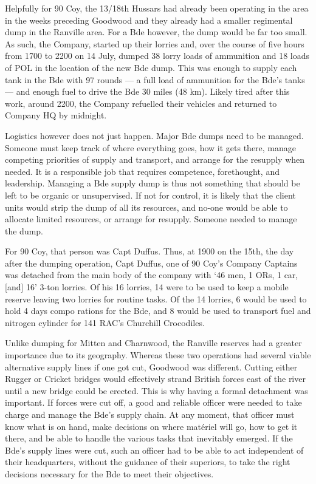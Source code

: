 \documentclass[noraggedright]{turabian-researchpaper}
\begin{document}
Helpfully for 90 Coy, the 13/18th Hussars had already been operating in the 
area in the weeks preceding Goodwood and they already had a smaller 
regimental dump in the Ranville area.  For a Bde however, the dump would be 
far too small.  As such, the Company, started up their lorries and, over the 
course of five hours from 1700 to 2200 on 14 July, dumped 38 lorry loads of 
ammunition and 18 loads of POL in the location of the new Bde dump.  This was 
enough to supply each tank in the Bde with 97 rounds --- a full load of 
ammunition for the Bde's tanks --- and enough fuel to drive the Bde 30 miles 
(48 km).  Likely tired after this work, around 2200, the Company refuelled 
their vehicles and returned to Company HQ by midnight.\autocite[14 July 1944]
{90wd}

Logistics however does not just happen.  Major Bde dumps need to be managed.  
Someone must keep track of where everything goes, how it gets there, manage 
competing priorities of supply and transport, and arrange for the resupply
when needed.  It is a responsible job that requires competence, forethought, 
and leadership.  Managing a Bde supply dump is thus not something that should 
be left to be organic or unsupervised.  If not for control, it is likely that 
the client units would strip the dump of all its resources, and no-one would 
be able to allocate limited resources, or arrange for resupply.  Someone 
needed to manage the dump.  

For 90 Coy, that person was Capt Duffus.  Thus, at 1900 on the 15th, the day 
after the dumping operation, Capt Duffus, one of 90 Coy's Company Captains
was detached from the main body of the company with `46 men, 1 ORs, 1 car, 
[and] 16' 3-ton lorries.\autocites[Whilst for June, document is in folder for 
July] [AF W 3008 for 17 June 1944 Serial 16]{90wd}  Of his 16 lorries, 14 were 
to be used to keep a mobile reserve
leaving two lorries for routine tasks.  Of the 14 lorries, 6 would be used to 
hold 4 days compo rations for the Bde, and 8 would be used to transport fuel
and nitrogen cylinder for 141 RAC's Churchill Crocodiles.\autocite
[15 July 1944]{90wd}

Unlike dumping for Mitten and Charnwood, the Ranville reserves had a greater 
importance due to its geography.  Whereas these two operations had several 
viable alternative supply lines if one got cut, Goodwood was different.  
Cutting either Rugger or Cricket bridges would effectively strand British 
forces east of the river until a new bridge could be erected.  This is why 
having a formal detachment was important.  If forces were cut off, a good and 
reliable officer were needed to take charge and manage the Bde's supply 
chain.  At any moment, that officer must know what is on hand, make decisions 
on where matériel will go, how to get it there, and be able to handle the 
various tasks that inevitably emerged.  If the Bde's supply lines were cut, 
such an officer had to be able to act independent of their headquarters, 
without the guidance of their superiors, to take the right decisions 
necessary for the Bde to meet their objectives.
\end{document}
